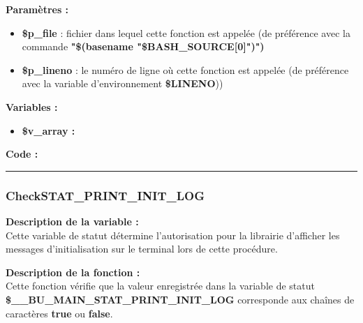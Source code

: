 \documentclass[a4paper,10pt]{article}
\begin{document}
\begin{justify}
    \textbf{Paramètres :}

    \begin{itemize}
        \item \color{orange}\textbf{\$p\_file}\color{white} : fichier dans lequel cette fonction est appelée (de préférence avec la commande \textbf{"\$(\color{gray}basename \color{white}"\color{orange}\$BASH\_SOURCE[0]\color{white}")")}\\

        \item \color{orange}\textbf{\$p\_lineno}\color{white} : le numéro de ligne où cette fonction est appelée (de préférence avec la variable d'environnement \textbf{\color{orange}\$LINENO}))
    \end{itemize}
\end{justify}


\begin{justify}
    \textbf{Variables :}

    \begin{itemize}
        \item \textbf{\color{orange}\$v\_array\color{white} :}
    \end{itemize}
\end{justify}

\begin{justify}
    \textbf{Code :}
\end{justify}



\color{blue}\par\noindent\rule{\textwidth}{0.4pt}\color{white}

\color{blue}
\subsubsection{CheckSTAT\_PRINT\_INIT\_LOG}\color{white}

\begin{justify}
    \textbf{Description de la variable :}\\
    Cette variable de statut détermine l'autorisation pour la librairie d'afficher les messages d'initialisation sur le terminal lors de cette procédure.
\end{justify}

\begin{justify}
    \textbf{Description de la fonction :}\\
    Cette fonction vérifie que la valeur enregistrée dans la variable de statut\\ \textbf{\color{orange}\$\_\_BU\_MAIN\_STAT\_PRINT\_INIT\_LOG} corresponde aux chaînes de caractères \textbf{true} ou \textbf{false}.
\end{justify}
\end{document}
